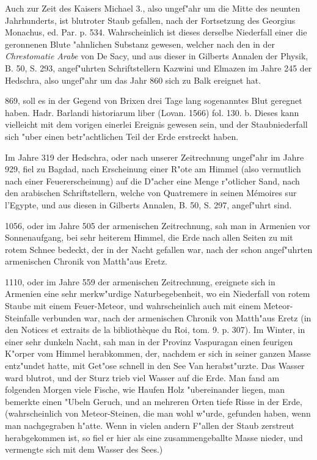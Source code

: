 \documentclass[a4paper, 11pt, oneside, polutonikogreek, german]{article}
\begin{document}
Auch zur Zeit des Kaisers Michael 3., also ungef"ahr um die Mitte des neunten Jahrhunderts, ist blutroter Staub gefallen, nach der Fortsetzung des Georgius Monachus, ed. Par. p. 534. Wahrscheinlich ist dieses derselbe Niederfall einer die geronnenen Blute "ahnlichen Substanz gewesen, welcher nach den in der \emph{Chrestomatie Arabe} von De Sacy, und aus dieser in Gilberts Annalen der Physik, B. 50, S. 293, angef"uhrten Schriftstellern Kazwini und Elmazen im Jahre 245 der Hedschra, also ungef"ahr um das Jahr 860 sich zu Balk ereignet hat.

869, soll es in der Gegend von Brixen drei Tage lang sogenanntes Blut geregnet haben. Hadr. Barlandi historiarum liber (Lovan. 1566) fol. 130. b. Dieses kann vielleicht mit dem vorigen einerlei Ereignis gewesen sein, und der Staubniederfall sich "uber einen betr"achtlichen Teil der Erde erstreckt haben.

Im Jahre 319 der Hedschra, oder nach unserer Zeitrechnung ungef"ahr im Jahre 929, fiel zu Bagdad, nach Erscheinung einer R"ote am Himmel (also vermutlich nach einer Feuererscheinung) auf die D"acher eine Menge r"otlicher Sand, nach den arabischen Schriftstellern, welche von Quatremere in seinen Mémoires sur l'Egypte, und aus diesen in Gilberts Annalen, B. 50, S. 297, angef"uhrt sind.

1056, oder im Jahre 505 der armenischen Zeitrechnung, sah man in Armenien vor Sonnenaufgang, bei sehr heiterem Himmel, die Erde nach allen Seiten zu mit rotem Schnee bedeckt, der in der Nacht gefallen war, nach der schon angef"uhrten armenischen Chronik von Matth"aus Eretz.

1110, oder im Jahre 559 der armenischen Zeitrechnung, ereignete sich in Armenien eine sehr merkw"urdige Naturbegebenheit, wo ein Niederfall von rotem Staube mit einem Feuer-Meteor, und wahrscheinlich auch mit einem Meteor-Steinfalle verbunden war, nach der armenischen Chronik von Matth"aus Eretz (in den Notices et extraits de la bibliothèque du Roi, tom. 9. p. 307). Im Winter, in einer sehr dunkeln Nacht, sah man in der Provinz Vaspuragan einen feurigen K"orper vom Himmel herabkommen, der, nachdem er sich in seiner ganzen Masse entz"undet hatte, mit Get"ose schnell in den See Van herabst"urzte. Das Wasser ward blutrot, und der Sturz trieb viel Wasser auf die Erde. Man fand am folgenden Morgen viele Fische, wie Haufen Holz "ubereinander liegen, man bemerkte einen "Ubeln Geruch, und an mehreren Orten tiefe Risse in der Erde, (wahrscheinlich von Meteor-Steinen, die man wohl w"urde, gefunden haben, wenn man nachgegraben h"atte. Wenn in vielen andern F"allen der Staub zerstreut herabgekommen ist, so fiel er hier als eine zusammengeballte Masse nieder, und vermengte sich mit dem Wasser des Sees.)
\end{document}
